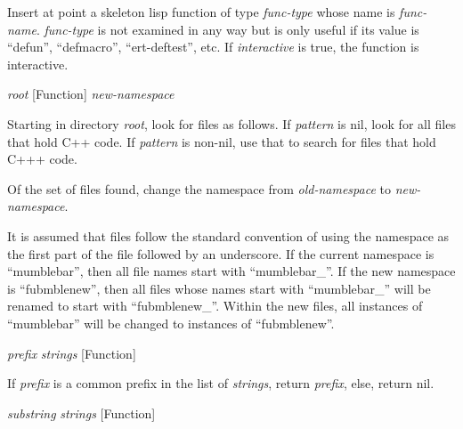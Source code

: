 \begin{doc-string}
Insert at point a skeleton lisp function of type \emph{func-type} whose name is
\emph{func-name}.  \emph{func-type} is not examined in any way but is only useful if its
value is ``defun'', ``defmacro'', ``ert-deftest'', etc.  If \emph{interactive} is
true, the function is interactive.
\end{doc-string}

\vspace{1em}
\noindent
{}
\usebox{\funcname}\emph{root}
 \hfill [Function]
\hspace*{\wd\funcname}\emph{new-namespace}
\hspace*{\wd\funcname}

\begin{doc-string}
Starting in directory \emph{root}, look for files as follows.  If \emph{pattern} is nil, look
for all files that hold C++ code.  If \emph{pattern} is non-nil, use that to search for
files that hold C+++ code.

Of the set of files found, change the namespace from \emph{old-namespace} to
\emph{new-namespace}.

It is assumed that files follow the standard convention of using the namespace as
the first part of the file followed by an underscore.  If the current namespace is
``mumblebar'', then all file names start with ``mumblebar\_''.  If the new namespace
is ``fubmblenew'', then all files whose names start with ``mumblebar\_'' will be
renamed to start with ``fubmblenew\_''.  Within the new files, all instances of
``mumblebar'' will be changed to instances of ``fubmblenew''.
\end{doc-string}

\vspace{1em}
\noindent
{}
\usebox{\funcname}\emph{prefix} \emph{strings}
 \hfill [Function]

\begin{doc-string}
If \emph{prefix} is a common prefix in the list of \emph{strings}, return \emph{prefix},
else, return nil.
\end{doc-string}

\vspace{1em}
\noindent
{}
\usebox{\funcname}\emph{substring} \emph{strings}
 \hfill [Function]

